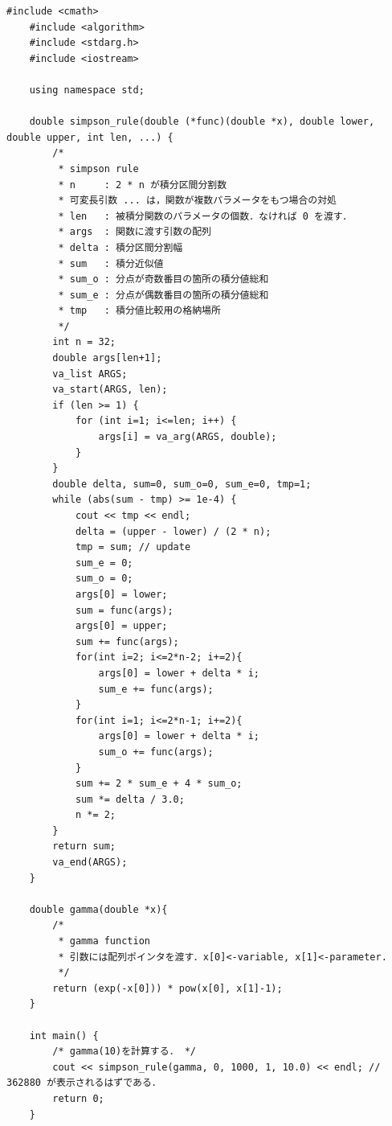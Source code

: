 \documentclass[a4j,papersize,disablejfam,slide,14pt]{jsarticle}
\begin{document}
    \begin{lstlisting}[style=customCpp]
    #include <cmath>
    #include <algorithm>
	#include <stdarg.h>
    #include <iostream>
    
    using namespace std;
    
    double simpson_rule(double (*func)(double *x), double lower, double upper, int len, ...) {
		/*
		 * simpson rule
         * n     : 2 * n が積分区間分割数
		 * 可変長引数 ... は，関数が複数パラメータをもつ場合の対処
         * len   : 被積分関数のパラメータの個数．なければ 0 を渡す．
		 * args  : 関数に渡す引数の配列
		 * delta : 積分区間分割幅
		 * sum   : 積分近似値
		 * sum_o : 分点が奇数番目の箇所の積分値総和
		 * sum_e : 分点が偶数番目の箇所の積分値総和
		 * tmp   : 積分値比較用の格納場所
		 */
		int n = 32;
		double args[len+1];
		va_list ARGS;
		va_start(ARGS, len);
		if (len >= 1) {
			for (int i=1; i<=len; i++) {
				args[i] = va_arg(ARGS, double);
			}
		}
		double delta, sum=0, sum_o=0, sum_e=0, tmp=1;
		while (abs(sum - tmp) >= 1e-4) {
			cout << tmp << endl;
			delta = (upper - lower) / (2 * n);
			tmp = sum; // update
			sum_e = 0;
			sum_o = 0;
			args[0] = lower;
			sum = func(args);
			args[0] = upper;
			sum += func(args);
			for(int i=2; i<=2*n-2; i+=2){
				args[0] = lower + delta * i;
				sum_e += func(args);
			}
			for(int i=1; i<=2*n-1; i+=2){
				args[0] = lower + delta * i;
				sum_o += func(args);
			}
			sum += 2 * sum_e + 4 * sum_o;
			sum *= delta / 3.0;
			n *= 2;
		}
		return sum;
	    va_end(ARGS);
	}
    
    double gamma(double *x){
		/* 
         * gamma function 
         * 引数には配列ポインタを渡す．x[0]<-variable, x[1]<-parameter.
         */
	    return (exp(-x[0])) * pow(x[0], x[1]-1);
	}
    
    int main() {
    	/* gamma(10)を計算する． */
    	cout << simpson_rule(gamma, 0, 1000, 1, 10.0) << endl; // 362880 が表示されるはずである．
        return 0;
    }
    \end{lstlisting}
\end{document}
